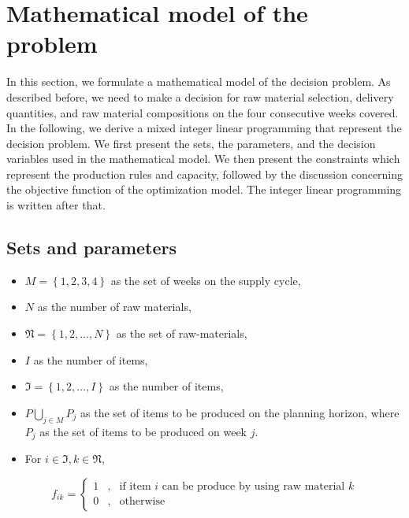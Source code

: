 \documentclass[preprint, 3p,
authoryear]{elsarticle} %
\providecommand{\tightlist}{%
  \setlength{\itemsep}{0pt}\setlength{\parskip}{0pt}}
\begin{document}
\hypertarget{mathematical-model-of-the-problem}{%
\section{Mathematical model of the
problem}\label{mathematical-model-of-the-problem}}

In this section, we formulate a mathematical model of the decision
problem. As described before, we need to make a decision for raw
material selection, delivery quantities, and raw material compositions
on the four consecutive weeks covered. In the following, we derive a
mixed integer linear programming that represent the decision problem. We
first present the sets, the parameters, and the decision variables used
in the mathematical model. We then present the constraints which
represent the production rules and capacity, followed by the discussion
concerning the objective function of the optimization model. The integer
linear programming is written after that.

\hypertarget{sets-and-parameters}{%
\subsection{Sets and parameters}\label{sets-and-parameters}}

\begin{itemize}
\tightlist
\item
  \(M = \left\{ 1,2,3,4 \right\}\) as the set of weeks on the supply
  cycle,
\item
  \(N\) as the number of raw materials,
\item
  \(\mathfrak{N}= \left\{ 1,2,...,N \right\}\) as the set of
  raw-materials,
\item
  \(I\) as the number of items,
\item
  \(\mathfrak{I} = \left\{ 1, 2, ..., I \right\}\) as the number of
  items,
\item
  \(P \bigcup_{j \in M} P_j\) as the set of items to be produced on the
  planning horizon, where \(P_j\) as the set of items to be produced on
  week \(j\).
\item
  For \(i \in \mathfrak{I}, k \in \mathfrak{N}\),
\end{itemize}

\[f_{ik} = 
\left\{\begin{matrix}
1 & , & \text{if item } i \text{ can be produce by using raw material } k  \\ 
0 & , & \text{otherwise}
\end{matrix}\right. 
\]
\end{document}
